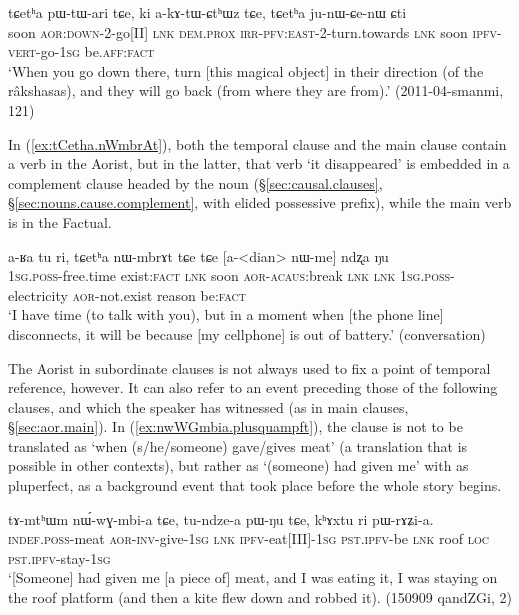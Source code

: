 \begin{exe}
\ex \label{ex:pWtari.nWtCu}
 \gll tɕetʰa pɯ-tɯ-ari tɕe, ki a-kɤ-tɯ-ɕtʰɯz tɕe, tɕetʰa ju-nɯ-ɕe-nɯ ɕti \\
 soon \textsc{aor}:\textsc{down}-2-go[II] \textsc{lnk} \textsc{dem}.\textsc{prox} \textsc{irr}-\textsc{pfv}:\textsc{east}-2-turn.towards \textsc{lnk} soon \textsc{ipfv}-\textsc{vert}-go-\textsc{1sg} be.\textsc{aff}:\textsc{fact} \\
 \glt `When you go down there, turn [this magical object] in their direction (of the râkshasas), and they will go back (from where they are from).' (2011-04-smanmi, 121)
\end{exe}


In (\ref{ex:tCetha.nWmbrAt}), both the temporal clause and the main clause contain a verb in the Aorist, but in the latter, that verb  `it disappeared' is embedded in a complement clause headed by the noun  (§\ref{sec:causal.clauses}, §\ref{sec:nouns.cause.complement}, with elided possessive prefix), while the main verb  is in the Factual.

\begin{exe}
\ex \label{ex:tCetha.nWmbrAt}
 \gll a-ʁa tu ri, tɕetʰa nɯ-mbrɤt tɕe tɕe [a-<dian> nɯ-me] ndʐa ŋu \\
 \textsc{1sg}.\textsc{poss}-free.time exist:\textsc{fact} \textsc{lnk} soon \textsc{aor}-\textsc{acaus}:break \textsc{lnk} \textsc{lnk} \textsc{1sg}.\textsc{poss}-electricity \textsc{aor}-not.exist reason be:\textsc{fact} \\
\glt `I have time (to talk with you), but in a moment when [the phone line] disconnects, it will be because [my cellphone] is out of battery.' (conversation)
\end{exe}

The Aorist in subordinate clauses is not always used to fix a point of temporal reference, however. It can also refer to an event preceding those of the following clauses, and which the speaker has witnessed (as in main clauses, §\ref{sec:aor.main}). In (\ref{ex:nwWGmbia.plusquampft}), the clause  is not to be translated as `when (s/he/someone) gave/gives meat' (a translation that is possible in other contexts), but rather as `(someone) had given me' with as pluperfect, as a background event that took place before the whole story begins.

\begin{exe}
\ex \label{ex:nwWGmbia.plusquampft}
 \gll tɤ-mtʰɯm nɯ́-wɣ-mbi-a tɕe, tu-ndze-a pɯ-ŋu tɕe, kʰɤxtu ri pɯ-rɤʑi-a. \\
 \textsc{indef}.\textsc{poss}-meat \textsc{aor}-\textsc{inv}-give-\textsc{1sg} \textsc{lnk} \textsc{ipfv}-eat[III]-\textsc{1sg} \textsc{pst}.\textsc{ipfv}-be \textsc{lnk} roof \textsc{loc} \textsc{pst}.\textsc{ipfv}-stay-\textsc{1sg} \\
 \glt `[Someone] had given me [a piece of] meat, and I was eating it, I was staying on the roof platform (and then a kite flew down and robbed it). (150909 qandZGi, 2)
\end{exe} 
 
